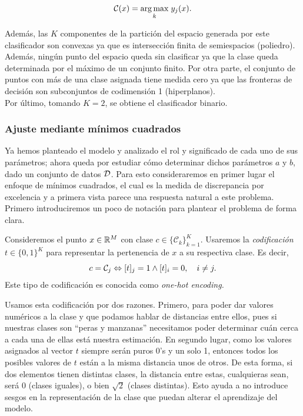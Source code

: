 \begin{equation}
	\mathcal{C}(x) = \underset{k}{\operatorname*{arg\,max}}\hspace{1mm} y_j(x).
\end{equation}

Además, las $K$ componentes de la partición del espacio generada por este clasificador son convexas ya que es intersección finita de semiespacios (poliedro). Además, ningún punto del espacio queda sin clasificar ya que la clase queda determinada por el máximo de un conjunto finito. Por otra parte, el conjunto de puntos con más de una clase asignada tiene medida cero ya que las fronteras de decisión son subconjuntos de codimensión 1 (hiperplanos).\\

Por último, tomando $K=2$, se obtiene el clasificador  binario.

\subsubsection{Ajuste mediante mínimos cuadrados}

Ya hemos planteado el modelo y analizado el rol  y significado de cada uno de sus parámetros; ahora queda por estudiar cómo determinar dichos parámetros $a$ y $b$, dado un conjunto de datos ${\mathcal D}$. Para esto consideraremos en primer lugar el enfoque de mínimos cuadrados, el cual es la medida de discrepancia  por  excelencia  y a primera vista  parece una respuesta natural a este problema. Primero  introduciremos un poco de notación para plantear el problema de forma clara.

Consideremos el  punto $x\in\mathbb{R}^M$ con clase $c\in\{\mathcal{C}_k\}_{k=1}^K$. Usaremos la \emph{codificación} $t \in\{0,1\}^K$ para representar la pertenencia de $x$ a su respectiva clase. Es decir, 
\begin{equation}
	c = {\mathcal C}_j \Leftrightarrow [t]_j=1 \wedge [t]_i=0, \quad i\neq j.
\end{equation}
Este tipo de codificación  es conocida como \emph{one-hot  encoding.}  

\begin{remark}
Usamos esta codificación por  dos razones. Primero, para poder dar valores numéricos a la clase y que  podamos hablar de distancias entre ellos, pues si nuestras clases son ``peras y manzanas'' necesitamos poder determinar cuán cerca a cada una de ellas está nuestra estimación. En segundo  lugar, como los valores asignados al vector $t$ siempre serán puros 0's y un solo 1, entonces  todos los posibles  valores de $t$ están a la misma distancia unos de otros. De esta forma, si dos elementos tienen distintas clases, la distancia entre estas, cualquieras sean, será 0 (clases iguales), o bien $\sqrt{2}$ (clases distintas). Esto ayuda a no introduce sesgos en la representación de la clase que puedan alterar el aprendizaje del modelo.  	
\end{remark}

